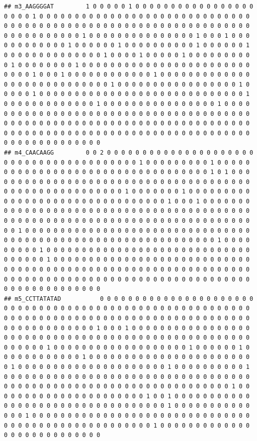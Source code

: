 \documentclass[
]{book}
\begin{document}
\begin{verbatim}
## m3_AAGGGGAT         1 0 0 0 0 0 1 0 0 0 0 0 0 0 0 0 0 0 0 0 0 0 0 0 0 0 0 0 1 0 0 0 0 0 0 0 0 0 0 0 0 0 0 0 0 0 0 0 0 0 0 0 0 0 0 0 0 0 0 0 0 0 0 0 0 0 0 0 0 0 0 0 0 0 0 0 0 0 0 0 0 0 0 0 0 0 0 0 0 0 0 0 0 0 0 0 0 0 0 0 0 0 0 0 0 1 0 0 0 0 0 0 0 0 0 0 0 0 0 0 0 1 0 0 0 1 0 0 0 0 0 0 0 0 0 0 0 0 1 0 0 0 0 0 0 1 0 0 0 0 0 0 0 0 0 0 1 0 0 0 0 0 0 1 0 0 0 0 0 0 0 0 0 0 0 0 0 0 1 0 0 0 0 1 0 0 0 0 0 1 0 0 0 0 0 0 0 0 0 0 1 0 0 0 0 0 0 0 0 1 0 0 0 0 0 0 0 0 0 0 0 0 0 0 0 0 0 0 0 0 0 0 0 0 0 0 0 0 1 0 0 0 1 0 0 0 0 0 0 0 0 0 0 0 0 1 0 0 0 0 0 0 0 0 0 0 0 0 0 0 0 0 0 0 0 0 0 0 0 0 0 0 0 0 1 0 0 0 0 0 0 0 0 0 0 0 0 0 0 0 0 0 1 0 0 0 0 0 1 0 0 0 0 0 0 0 0 0 0 0 0 0 0 0 0 0 0 0 0 0 0 0 0 0 0 0 0 0 1 0 0 0 0 0 0 0 0 0 0 0 0 0 1 0 0 0 0 0 0 0 0 0 0 0 0 0 0 0 0 1 0 0 0 0 0 0 0 0 0 0 0 0 0 0 0 0 0 0 0 0 0 0 0 0 0 0 0 0 0 0 0 0 0 0 0 0 0 0 0 0 0 0 0 0 0 0 0 0 0 0 0 0 0 0 0 0 0 0 0 0 0 0 0 0 0 0 0 0 0 0 0 0 0 0 0 0 0 0 0 0 0 0 0 0 0 0 0 0 0 0 0 0 0 0 0 0 0 0 0 0 0 0 0 0 0 0 0 0 0 0 0 0 0 0 0 0 0 0 0 0 0 0 0
## m4_CAACAAGG         0 0 2 0 0 0 0 0 0 0 0 0 0 0 0 0 0 0 0 0 0 0 0 0 0 0 0 0 0 0 0 0 0 0 0 0 0 0 0 0 0 0 0 1 0 0 0 0 0 0 0 0 0 1 0 0 0 0 0 0 0 0 0 0 0 0 0 0 0 0 0 0 0 0 0 0 0 0 0 0 0 0 0 0 0 0 0 0 1 0 1 0 0 0 0 0 0 0 0 0 0 0 0 0 0 0 0 0 0 0 0 0 0 0 0 0 0 0 0 0 0 0 0 0 0 0 0 0 0 0 0 0 0 0 0 0 0 0 0 0 0 0 0 0 0 0 1 0 0 0 0 0 0 0 1 0 0 0 0 0 0 0 0 0 0 0 0 0 0 0 0 0 0 0 0 0 0 0 0 0 0 0 0 0 0 0 0 1 0 0 0 1 0 0 0 0 0 0 0 0 0 0 0 0 0 0 0 0 0 0 0 0 0 0 0 0 0 0 0 0 0 0 0 0 0 0 0 0 0 0 0 0 0 0 0 0 0 0 0 0 0 0 0 0 0 0 0 0 0 0 0 0 0 0 0 0 0 0 0 0 0 0 0 0 0 0 0 0 0 0 0 1 0 0 0 0 0 0 0 0 0 0 0 0 0 0 0 0 0 0 0 0 0 0 0 0 0 0 0 0 0 0 0 0 0 0 0 0 0 0 0 0 0 0 0 0 0 0 0 0 0 0 0 0 0 0 0 0 0 0 0 0 0 0 1 0 0 0 0 0 0 0 0 0 1 0 0 0 0 0 0 0 0 0 0 0 0 0 0 0 0 0 0 0 0 0 0 0 0 0 0 0 0 0 0 0 0 0 0 0 1 0 0 0 0 0 0 0 0 0 0 0 0 0 0 0 0 0 0 0 0 0 0 0 0 0 0 0 0 0 0 0 0 0 0 0 0 0 0 0 0 0 0 0 0 0 0 0 0 0 0 0 0 0 0 0 0 0 0 0 0 0 0 0 0 0 0 0 0 0 0 0 0 0 0 0 0 0 0 0 0 0 0 0 0 0 0 0 0 0 0 0 0 0 0 0 0 0 0 0 0 0 0 0 0 0 0 0 0 0 0 0 0
## m5_CCTTATATAD           0 0 0 0 0 0 0 0 0 0 0 0 0 0 0 0 0 0 0 0 0 0 0 0 0 0 0 0 0 0 0 0 0 0 0 0 0 0 0 0 0 0 0 0 0 0 0 0 0 0 0 0 0 0 0 0 0 0 0 0 0 0 0 0 0 0 0 0 0 0 0 0 0 0 0 0 0 0 0 0 0 0 0 0 0 0 0 0 0 0 0 0 0 0 0 0 0 0 0 0 0 0 0 0 0 1 0 0 0 1 0 0 0 0 0 0 0 0 0 0 0 0 0 0 0 0 0 0 0 0 0 0 0 0 0 0 0 0 0 0 0 0 0 0 0 0 0 0 0 0 0 0 0 0 0 0 0 0 0 0 0 0 0 0 0 0 0 0 1 0 0 0 0 0 0 0 0 0 0 0 0 0 0 0 0 0 0 0 1 0 0 0 0 0 0 1 0 0 0 0 0 0 0 0 0 0 0 0 1 0 0 0 0 0 0 0 0 0 0 0 0 0 0 0 0 0 0 0 0 0 0 0 0 1 0 0 0 0 0 0 0 0 0 0 0 0 0 0 0 0 0 0 0 0 0 1 0 0 0 0 0 0 0 0 0 0 1 0 0 0 0 0 0 0 0 0 0 0 0 0 0 0 0 0 0 0 0 0 0 0 0 0 0 0 0 0 0 0 0 0 0 0 0 0 0 0 0 0 0 0 0 0 0 0 0 0 0 0 0 0 0 0 0 0 0 0 0 0 0 0 0 0 0 0 1 0 0 0 0 0 0 0 0 0 0 0 0 0 0 0 0 0 0 0 0 0 0 1 0 0 1 0 0 0 0 0 0 0 0 0 0 0 0 0 0 0 0 0 0 0 0 0 0 0 0 0 0 0 0 0 0 0 0 0 0 1 0 0 0 0 0 0 0 0 0 0 0 0 0 0 1 0 0 0 0 0 0 0 0 0 0 0 0 0 0 0 0 0 0 0 0 0 0 0 0 0 0 0 0 0 0 0 0 0 0 0 0 0 0 0 0 0 0 0 0 0 0 0 0 0 0 0 0 1 0 0 0 0 0 0 0 0 0 0 0 0 0 0 0 0 0 0 0 0 0 0 0 0 0 0 0

\end{verbatim}
\end{document}
